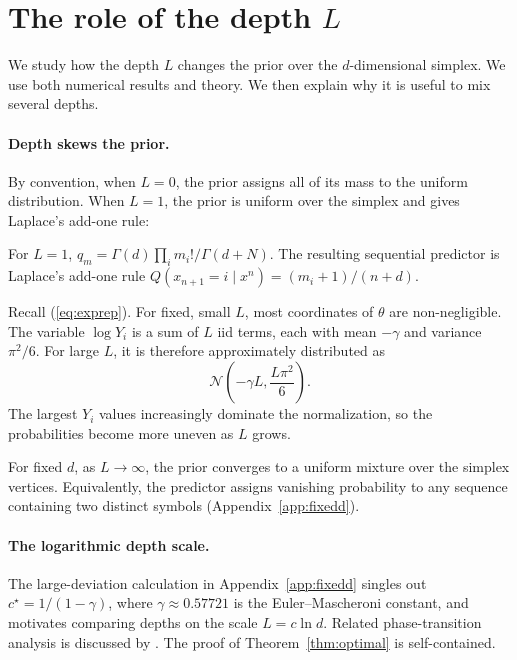 \documentclass[anon]{alt2027}
\newcommand{\cstar}{c^{\star}}
\renewcommand{\eqref}[1]{(\ref{#1})}
\begin{document}
\section{The role of the depth \texorpdfstring{$L$}{L}}
\label{sec:depth}

We study how the depth $L$ changes the prior over the $d$-dimensional simplex. We use both numerical results and theory. We then explain why it is useful to mix several depths.

\paragraph{Depth skews the prior.}

By convention, when $L=0$, the prior assigns all of its mass to the uniform distribution. When $L=1$, the prior is uniform over the simplex and gives Laplace's add-one rule:

\begin{proposition}
\label{prop:laplace}
For $L=1$, $q_m=\Gamma(d)\prod_i m_i!/\Gamma(d+N)$. The resulting sequential predictor is Laplace's add-one rule $Q(x_{n+1}=i\mid x^n)=(m_i+1)/(n+d)$.
\end{proposition}

Recall \eqref{eq:exprep}. For fixed, small $L$,
most coordinates of $\theta$ are non-negligible. The variable $\log Y_i$ is a sum of $L$ iid terms, each with mean $-\gamma$ and variance $\pi^2/6$. For large $L$, it is therefore approximately distributed as\[\mathcal{N}\left(-\gamma L,\frac{L\pi^2}{6}\right).\]The largest $Y_i$ values increasingly dominate the normalization, so the probabilities become more uneven as $L$ grows. 

For fixed $d$, as $L\to\infty$, the prior converges to a uniform mixture over the simplex vertices. Equivalently, the predictor assigns vanishing probability to any sequence containing two distinct symbols (Appendix~\ref{app:fixedd}). 

\paragraph{The logarithmic depth scale.}
The large-deviation calculation in Appendix~\ref{app:fixedd} singles out $\cstar=1/(1-\gamma)$, where $\gamma\approx0.57721$ is the Euler--Mascheroni constant, and motivates comparing depths on the scale $L=c\ln d$. Related phase-transition analysis is discussed by \citet{jeong2026phase}. The proof of Theorem~\ref{thm:optimal} is self-contained.
\end{document}
